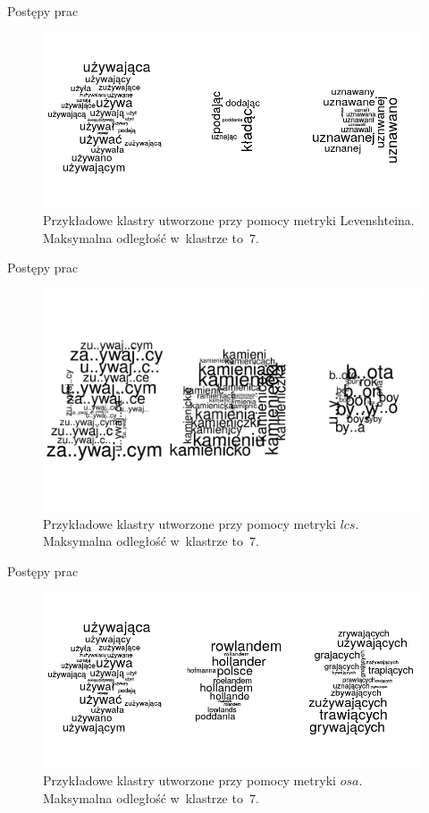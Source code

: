 \documentclass[11pt,pdftex,mathserif]{beamer}\usepackage[]{graphicx}\usepackage[]{color}
\theoremstyle{definition}
\begin{document}
\begin{frame}{Postępy prac}
\begin{figure}[h]
      \centering
      \includegraphics[width=12cm] {lv}
      \caption{Przykładowe klastry utworzone przy pomocy metryki Levenshteina. Maksymalna odległość w~klastrze to~$7$.}
    \end{figure}
\end{frame}



\begin{frame}{Postępy prac}
\begin{figure}[h]
      \centering
      \includegraphics[width=12cm] {lcs}
      \caption{Przykładowe klastry utworzone przy pomocy metryki $lcs$. Maksymalna odległość w~klastrze to~$7$.}
    \end{figure}
\end{frame}



\begin{frame}{Postępy prac}
\begin{figure}[h]
      \centering
      \includegraphics[width=12cm] {osa}
      \caption{Przykładowe klastry utworzone przy pomocy metryki $osa$. Maksymalna odległość w~klastrze to~$7$.}
    \end{figure}
\end{frame}
\end{document}

